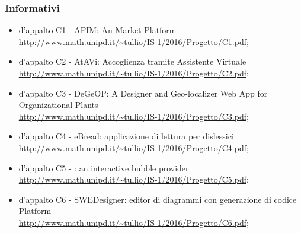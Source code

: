 		\subsubsection {Informativi}
			\begin {itemize}
				\item {} d'appalto C1 - APIM: An  Market Platform \\
					\url {http://www.math.unipd.it/~tullio/IS-1/2016/Progetto/C1.pdf};
				\item {} d'appalto C2 - AtAVi: Accoglienza tramite Assistente Virtuale \\
				\url {http://www.math.unipd.it/~tullio/IS-1/2016/Progetto/C2.pdf};
				\item {} d'appalto C3 - DeGeOP: A Designer and Geo-localizer Web App for Organizational Plants \\
					\url {http://www.math.unipd.it/~tullio/IS-1/2016/Progetto/C3.pdf};
					\item {} d'appalto C4 - eBread: applicazione di lettura per dislessici  \\
					\url {http://www.math.unipd.it/~tullio/IS-1/2016/Progetto/C4.pdf};
					\item {} d'appalto C5 - : an interactive bubble provider \\
					\url {http://www.math.unipd.it/~tullio/IS-1/2016/Progetto/C5.pdf};
					\item {} d'appalto C6 - SWEDesigner: editor di diagrammi  con generazione di codice Platform \\
					\url {http://www.math.unipd.it/~tullio/IS-1/2016/Progetto/C6.pdf};
					
				
			\end {itemize}
		
		